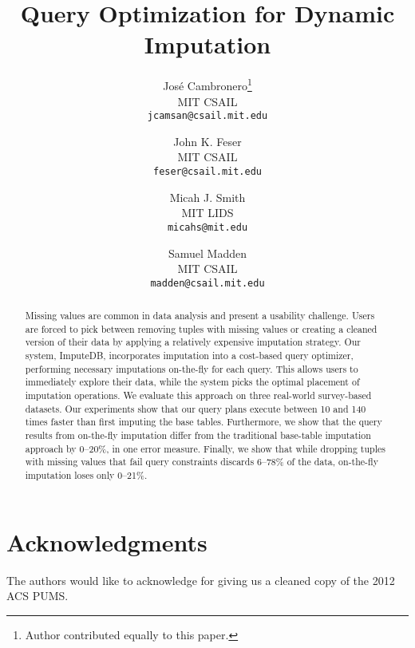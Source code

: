 \documentclass[preprint]{vldb}
\title{Query Optimization for Dynamic Imputation}
\author{
  Jos\'e Cambronero\thanks{Author contributed equally to this paper.} \\
  MIT CSAIL \\
  \texttt{jcamsan@csail.mit.edu}
  \and
  John K. Feser\footnotemark[1] \\
  MIT CSAIL \\
  \texttt{feser@csail.mit.edu}
  \and
  Micah J. Smith\footnotemark[1] \\
  MIT LIDS \\
  \texttt{micahs@mit.edu}
  \and
  Samuel Madden \\
  MIT CSAIL \\
  \texttt{madden@csail.mit.edu}}
\newcommand{\ProjectName}{ImputeDB\xspace}
\newcommand{\lowxalphazero}{10} %
\newcommand{\highxalphazero}{140} %
\newcommand{\lowsmapealphazero}{0} %
\newcommand{\highsmapealphaone}{20} %
\begin{document}
\maketitle

\begin{abstract}
  Missing values are common in data analysis and present a usability challenge.
  Users are forced to pick between removing tuples with missing values or creating a cleaned version of their data by applying a relatively expensive imputation strategy.
  Our system, \ProjectName{}, incorporates imputation into a cost-based query optimizer, performing necessary imputations on-the-fly for each query.
  This allows users to immediately explore their data, while the system picks the optimal placement of imputation operations.
  We evaluate this approach on three real-world survey-based datasets.
  Our experiments show that our query plans execute between \lowxalphazero{} and \highxalphazero{} times faster than first imputing the base tables.
  Furthermore, we show that the query results from on-the-fly imputation differ from the
  traditional base-table imputation approach by \lowsmapealphazero{}--\highsmapealphaone{}\%, in one error measure.
  Finally, we show that while dropping tuples with missing values that fail query constraints discards 6--78\% of the data, on-the-fly imputation loses only 0--21\%.
\end{abstract}









\section{Acknowledgments}
The authors would like to acknowledge \citeauthor{akande2015empirical} for giving us a cleaned copy of the 2012 ACS PUMS.

\balance
\printbibliography
\end{document}
